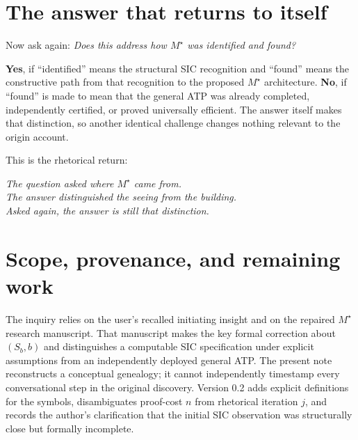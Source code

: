 \documentclass[11pt,letterpaper]{article}
\newcommand{\Ms}{M^{\star}}
\begin{document}
\section{The answer that returns to itself}
\vspace{2pt}
\noindent{}

Now ask again: \emph{Does this address how $M^{\star}$ was identified and found?}

\textbf{Yes}, if ``identified'' means the structural SIC recognition and ``found'' means the constructive path from that recognition to the proposed $\Ms$ architecture. \textbf{No}, if ``found'' is made to mean that the general ATP was already completed, independently certified, or proved universally efficient. The answer itself makes that distinction, so another identical challenge changes nothing relevant to the origin account.

This is the rhetorical return:
\begin{center}
\large\itshape
The question asked where $M^{\star}$ came from.\\
The answer distinguished the seeing from the building.\\
Asked again, the answer is still that distinction.
\end{center}

\section{Scope, provenance, and remaining work}
The inquiry relies on the user's recalled initiating insight and on the repaired $M^{\star}$ research manuscript. That manuscript makes the key formal correction about $(S_b,b)$ and distinguishes a computable SIC specification under explicit assumptions from an independently deployed general ATP. The present note reconstructs a conceptual genealogy; it cannot independently timestamp every conversational step in the original discovery. Version 0.2 adds explicit definitions for the symbols, disambiguates proof-cost $n$ from rhetorical iteration $j$, and records the author's clarification that the initial SIC observation was structurally close but formally incomplete.
\end{document}
